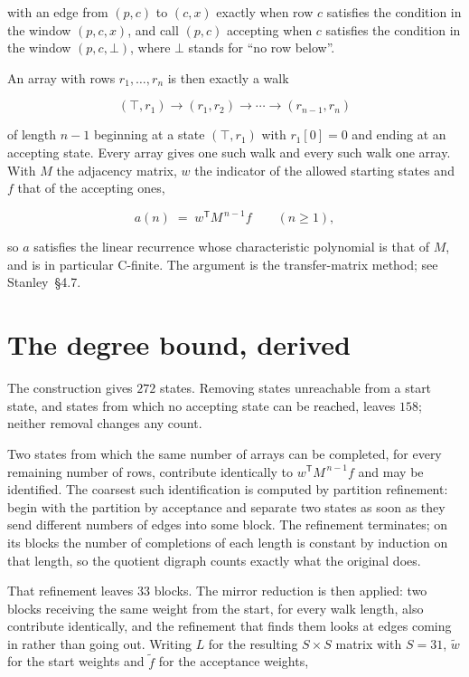 \documentclass[11pt]{article}
\theoremstyle{definition}
\begin{document}
with an edge from $(p,c)$ to $(c,x)$ exactly when row $c$ satisfies the condition in the window $(p,c,x)$, and call $(p,c)$ accepting when $c$ satisfies the condition in the window $(p,c,\bot)$, where $\bot$ stands for ``no row below''.

An array with rows $r_1,\dots,r_n$ is then exactly a walk

\[(\top,r_1) \to (r_1,r_2) \to \cdots \to (r_{n-1},r_n)\]

of length $n-1$ beginning at a state $(\top,r_1)$ with $r_1[0]=0$ and ending at an accepting state. Every array gives one such walk and every such walk one array. With $M$ the adjacency matrix, $w$ the indicator of the allowed starting states and $f$ that of the accepting ones,

\[a(n) \;=\; w^{\mathsf T} M^{\,n-1} f \qquad (n \ge 1),\]

so $a$ satisfies the linear recurrence whose characteristic polynomial is that of $M$, and is in particular C-finite. The argument is the transfer-matrix method; see Stanley~\S4.7.

\section{The degree bound, derived}

The construction gives $272$ states. Removing states unreachable from a start state, and states from which no accepting state can be reached, leaves $158$; neither removal changes any count.

Two states from which the same number of arrays can be completed, for every remaining number of rows, contribute identically to $w^{\mathsf T}M^{\,n-1}f$ and may be identified. The coarsest such identification is computed by partition refinement: begin with the partition by acceptance and separate two states as soon as they send different numbers of edges into some block. The refinement terminates; on its blocks the number of completions of each length is constant by induction on that length, so the quotient digraph counts exactly what the original does.

That refinement leaves $33$ blocks. The mirror reduction is then applied: two blocks receiving the same weight from the start, for every walk length, also contribute identically, and the refinement that finds them looks at edges coming in rather than going out. Writing $L$ for the resulting $S \times S$ matrix with $S = 31$, $\tilde w$ for the start weights and $\tilde f$ for the acceptance weights,
\end{document}
